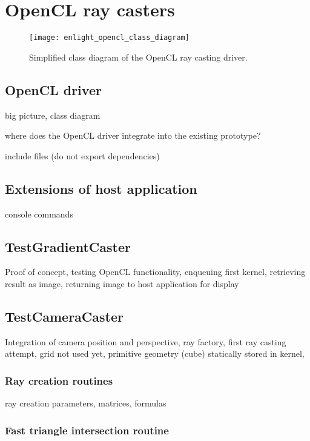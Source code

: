 \section{OpenCL ray casters}
\label{sec:opencl_caster}

\begin{figure}
\centering
\texttt{[image: enlight\_opencl\_class\_diagram]}
\caption{Simplified class diagram of the OpenCL ray casting driver.}
\label{fig:enlight_opencl_class_diagram}
\end{figure}

\subsection{OpenCL driver}

big picture, class diagram

where does the OpenCL driver integrate into the existing prototype?

include files (do not export dependencies)

\subsection{Extensions of host application}

console commands

\subsection{TestGradientCaster}

Proof of concept, testing OpenCL functionality, enqueuing first kernel, retrieving result as image, returning image to host application for display

\subsection{TestCameraCaster}

Integration of camera position and perspective, ray factory, first ray casting attempt, grid not used yet, primitive geometry (cube) statically stored in kernel,

\subsubsection{Ray creation routines}

ray creation parameters, matrices, formulas

\subsubsection{Fast triangle intersection routine}

